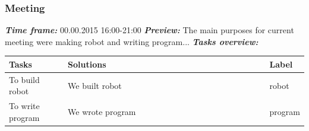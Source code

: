 \addtocounter{number_of_meeting}{1}
\subsubsection{ Meeting}
	\textit{\textbf{Time frame:}} 00.00.2015 16:00-21:00 \newline
	\textit{\textbf{Preview:}} The main purposes for current meeting were making robot and writing program...\newline \newline
	\textit{\textbf{Tasks overview:}}

  \begin{table}[H]
	\vspace{-2mm}
	\begin{center}
		\begin{tabular}{|p{0.2\linewidth}|p{0.7\linewidth}|p{0.1\linewidth}|}
			\hline
			Tasks & Solutions & Label \\
			\hline
			To build robot & We built robot & robot \\
			\hline
			To write program & We wrote program & program \\
			\hline
		\end{tabular}
	\end{center}
  \end{table}
  
